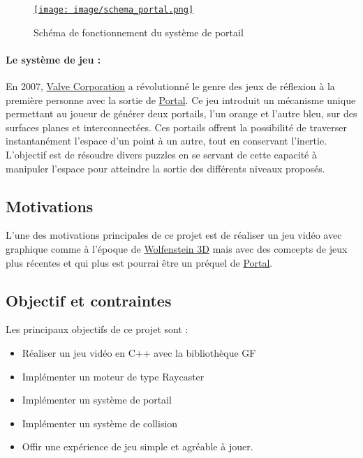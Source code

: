 \documentclass[12pt]{report}
\begin{document}
\begin{figure}
	\centering
	\href{https://fr.wikipedia.org/wiki/Portal_(jeu_vid%C3%A9o)}{\texttt{[image: image/schema\_portal.png]}}
	\hspace*{-0.5cm}
	\caption{Schéma de fonctionnement du système de portail}
	\label{fig:schema_portal}
\end{figure}

\paragraph{Le système de jeu : }
En 2007, \href{https://fr.wikipedia.org/wiki/Valve_Corporation}{Valve Corporation} a révolutionné le genre des jeux 
de réflexion à la première personne avec la sortie de 
\href{https://fr.wikipedia.org/wiki/Portal_(jeu_vid%C3%A9o)}{Portal}. Ce jeu introduit un mécanisme unique 
permettant au joueur de générer deux portails, l'un orange et l'autre bleu, sur des surfaces planes et 
interconnectées. Ces portails offrent la possibilité de traverser instantanément l'espace d'un point à un autre, 
tout en conservant l'inertie. L'objectif est de résoudre divers puzzles en se servant de cette capacité à manipuler 
l'espace pour atteindre la sortie des différents niveaux proposés.



\subsection{Motivations}


L'une des motivations principales de ce projet est de réaliser un jeu vidéo
avec graphique comme à l'époque de \href{https://fr.wikipedia.org/wiki/Wolfenstein_3D}{Wolfenstein 3D} 
mais avec des comcepts de jeux plus récentes et qui plus est pourrai être
un préquel de \href{https://fr.wikipedia.org/wiki/Portal_(jeu_vid%C3%A9o)}{Portal}.
\subsection{Objectif et contraintes}

Les principaux objectifs de ce projet sont :
\begin{itemize}
	\item Réaliser un jeu vidéo en C++ avec la bibliothèque GF
	\item Implémenter un moteur de type Raycaster
	\item Implémenter un système de portail
	\item Implémenter un système de collision
	\item Offir une expérience de jeu simple et agréable à jouer.
\end{itemize}
\end{document}
